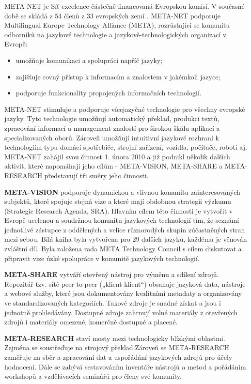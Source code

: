 \begin{multicols}{2}
META-NET je Síť excelence částečně financovaná Evropskou komisí. V současné době se skládá z 54 členů z 33 evropských zemí \cite{rehm2011}. META-NET podporuje Multilingual Europe Technology Alliance (META), rozrůstající se komunitu odborníků na jazykové technologie a jazykově-technologických organizací v Evropě: \\
    \begin{itemize}
      \item umožňuje komunikaci a spolupráci napříč jazyky;
      \item zajišťuje rovný přístup k informacím a znalostem v jakémkoli jazyce;
      \item podporuje funkcionality propojených informačních technologií.
    \end{itemize}
META-NET stimuluje a podporuje vícejazyčné technologie pro všechny evropské jazyky. Tyto technologie umožňují automatický překlad, produkci textů, zpracování informací a management znalostí pro širokou škálu aplikací a specializovaných oborů. Zároveň umožňují intuitivní jazykové rozhraní k technologiím typu domácí spotřebiče, strojní zařízení, vozidla, počítače, roboti aj. META-NET zahájil svou činnost 1. února 2010 a již podnikl několik dalších aktivit, které napomáhají jeho cílům - META-VISION, META-SHARE a META-RESEARCH představují tři směry jeho činnosti.

\textbf{META-VISION} podporuje dynamickou a vlivnou komunitu zainteresovaných subjektů, které spojuje stejná vize a které mají obdobnou strategii výzkumu (Strategic Research Agenda, SRA). Hlavním cílem této činnosti je vytvořit v Evropě ucelenou a soudržnou komunitu jazykových technologií tím, že seznámí jednotlivé zástupce z oddělených a velice různorodých skupin zúčastněných stran mezi sebou. Bílá kniha byla vytvořena pro 29 dalších jazyků, každému je věnován zvláštní díl. Byla založena rada META Technology Council s cílem diskutovat a připravit vize úzké spolupráce v komunitě jazykových technologií.

\textbf{META-SHARE} vytváří otevřený nástroj pro výměnu a sdílení zdrojů. Repozitář tzv. sítě peer-to-peer („klient-klient“) obsahuje jazyková data, nástroje a webové služby, které jsou dokumentovány kvalitními metadaty a organizovány ve standardizovaných kategoriích. Takové zdroje je snadné získat a jsou i jednotně prohledávány. Dostupné zdroje zahrnují  volné materiály z otevřených zdrojů i materiály omezené, komerčně dostupné a placené. 

\textbf{META-RESEARCH} staví mosty mezi technologicky blízkými oblastmi. Zejména se soustřeďuje na strojový překlad.Zároveň se META-RESEARCH zaměřuje na sběr a zpracování dat a uspořádání jazykových zdrojů pro účely hodnocení. Dále se zabývá sestavováním inventáře nástrojů a metod a pořádáním workshopů a vzdělávacích seminářů pro členy své komunity. 

\end{multicols}

